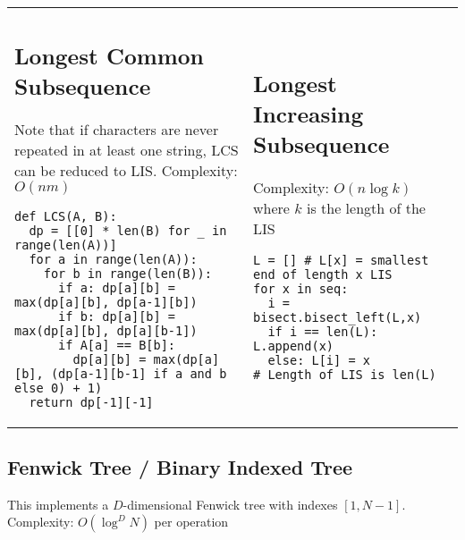 \documentclass[letterpaper]{article}
\begin{document}
\begin{tabular}{@{}p{9.5cm}p{8.5cm}@{}}
    \subsection{Longest Common Subsequence}
    Note that if characters are never repeated in at least one string, LCS can be reduced to LIS. Complexity: $O\left(nm\right)$

    \begin{lstlisting}
def LCS(A, B):
  dp = [[0] * len(B) for _ in range(len(A))]
  for a in range(len(A)):
    for b in range(len(B)):
      if a: dp[a][b] = max(dp[a][b], dp[a-1][b])
      if b: dp[a][b] = max(dp[a][b], dp[a][b-1])
      if A[a] == B[b]:
        dp[a][b] = max(dp[a][b], (dp[a-1][b-1] if a and b else 0) + 1)
  return dp[-1][-1]
\end{lstlisting}
     &
    \subsection{Longest Increasing Subsequence}
    Complexity: $O\left(n\log k\right)$ where $k$ is the length of the LIS

    \begin{lstlisting}
L = [] # L[x] = smallest end of length x LIS
for x in seq:
  i = bisect.bisect_left(L,x)
  if i == len(L): L.append(x)
  else: L[i] = x
# Length of LIS is len(L)
\end{lstlisting}
\end{tabular}

\clearpage

\subsection{Fenwick Tree / Binary Indexed Tree}

This implements a $D$-dimensional Fenwick tree with indexes $\left[1,N-1\right]$. Complexity: $O\left(\log^DN\right)$ per operation
\end{document}
